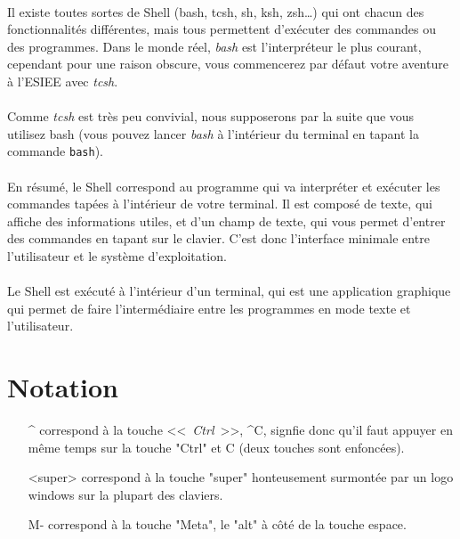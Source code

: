 \documentclass[french, a4paper, 12pt, titlepage]{article}
\begin{document}
\paragraph{} Il existe toutes sortes de Shell (bash, tcsh, sh, ksh, zsh\dots)
qui ont chacun des fonctionnalités différentes, mais tous permettent d'exécuter
des commandes ou des programmes. Dans le monde réel, \emph{bash} est
l'interpréteur le plus courant, cependant pour une raison obscure, vous
commencerez par défaut votre aventure à l'ESIEE avec \emph{tcsh}.

\paragraph{} Comme \emph{tcsh} est très peu convivial, nous supposerons par la
suite que vous utilisez bash (vous pouvez lancer \emph{bash} à l'intérieur du
terminal en tapant la commande \texttt{bash}).

\paragraph{} En résumé, le Shell correspond au programme qui va interpréter et
exécuter les commandes tapées à l'intérieur de votre terminal. Il est composé
de texte, qui affiche des informations utiles, et d'un champ de texte, qui vous
permet d'entrer des commandes en tapant sur le clavier. C'est donc l'interface
minimale entre l'utilisateur et le système d'exploitation.

\paragraph{} Le Shell est exécuté à l'intérieur d'un terminal, qui est une
application graphique qui permet de faire l'intermédiaire entre les programmes
en mode texte et l'utilisateur.

\section{Notation}

\begin{enumerate}
	\item[\^{}] correspond à la touche <<~\emph{Ctrl}~>>, \^{}C, signfie donc
		qu'il faut appuyer en même temps sur la touche "Ctrl" et C (deux
		touches sont enfoncées).
	\item [<super>] correspond à la touche "super" honteusement surmontée par
		un logo windows sur la plupart des claviers.
	\item [M-] correspond à la touche "Meta", le "alt" à côté de la touche
		espace.
\end{enumerate}
\end{document}
